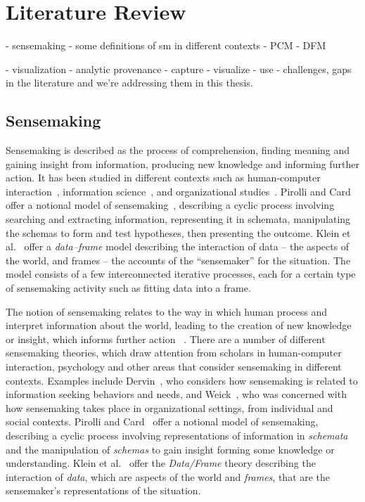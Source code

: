 \chapter{Literature Review}

\graphicspath{{Chapter2/figures/}}

- sensemaking
 - some definitions of sm in different contexts
 - PCM
 - DFM
 
- visualization
- analytic provenance
 - capture
 - visualize
 - use
- challenges, gaps in the literature and we're addressing them in this thesis.



 
 \section{Sensemaking}
 Sensemaking is described as the process of comprehension, finding meaning and gaining insight from information, producing new knowledge and informing further action. It has been studied in different contexts such as human-computer interaction~\cite{Russell1993}, information science~\cite{Dervin1983}, and organizational studies~\cite{Weick1995}. Pirolli and Card offer a notional model of sensemaking~\cite{Pirolli2005}, describing a cyclic process involving searching and extracting information, representing it in schemata, manipulating the schemas to form and test hypotheses, then presenting the outcome. Klein et al.~\cite{Klein2006} offer a \textit{data--frame} model describing the interaction of data -- the aspects of the world, and frames -- the accounts of the ``sensemaker'' for the situation. The model consists of a few interconnected iterative processes, each for a certain type of sensemaking activity such as fitting data into a frame.

The notion of sensemaking relates to the way in which human process and interpret information about the world, leading to the creation of new knowledge or insight, which informs further action ~\cite{Pirolli2005}. There are a number of different sensemaking theories, which draw attention from scholars in human-computer interaction, psychology and other areas that consider sensemaking in different contexts. Examples include Dervin~\cite{Dervin1983}, who considers how sensemaking is related to information seeking behaviors and needs, and Weick~\cite{Weick1995}, who was concerned with how sensemaking takes place in organizational settings, from individual and social contexts. Pirolli and Card~\cite{Pirolli2005} offer a notional model of sensemaking, describing a cyclic process involving representations of information in \textit{schemata} and the manipulation of \textit{schemas} to gain insight forming some knowledge or understanding. Klein et al.~\cite{Klein2006} offer the \textit{Data/Frame} theory describing the interaction of \textit{data}, which are aspects of the world and \textit{frames}, that are the sensemaker’s representations of the situation. 

